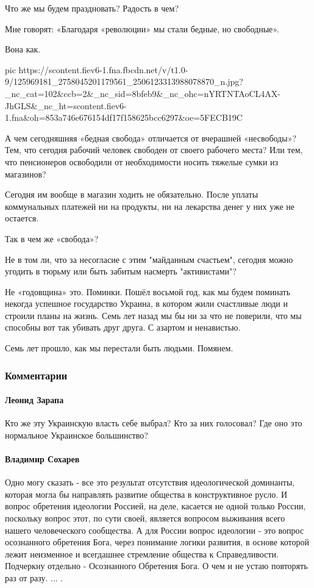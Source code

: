 Что же мы будем праздновать? Радость в чем? 

Мне говорят: «Благодаря «революции» мы стали бедные, но свободные».

Вона как.

\ifcmt
pic https://scontent.fiev6-1.fna.fbcdn.net/v/t1.0-9/125969181_2758045201179561_2506123313988078870_n.jpg?_nc_cat=102&ccb=2&_nc_sid=8bfeb9&_nc_ohc=nYRTNTAoCL4AX-JhGLS&_nc_ht=scontent.fiev6-1.fna&oh=853a746e676154df17f158625bcc6297&oe=5FECB19C
\fi

А чем сегодняшняя «бедная свобода» отличается от вчерашней «несвободы»? Тем,
что сегодня рабочий человек свободен от своего рабочего места? Или тем, что
пенсионеров освободили от необходимости носить тяжелые сумки из магазинов?

Сегодня им вообще в магазин ходить не обязательно. После уплаты коммунальных
платежей ни на продукты, ни на лекарства денег у них уже не остается. 

Так в чем же «свобода»? 

Не в том ли, что за несогласие с этим "майданным счастьем", сегодня можно
угодить в тюрьму или быть забитым насмерть "активистами"?

Не «годовщина» это. Поминки. Пошёл восьмой год, как  мы будем поминать некогда
успешное государство Украина, в котором  жили счастливые люди и строили планы
на жизнь. Семь лет назад мы бы ни за что не поверили, что мы способны вот так
убивать друг друга. С азартом и ненавистью. 

Семь лет прошло, как мы перестали быть людьми. Помянем.

\subsubsection{Комментарии}

\paragraph{Леонид Зарапа}
Кто же эту Украинскую власть себе выбрал? Кто за них голосовал? Где оно это
нормальное Украинское большинство?

\paragraph{Владимир Сохарев}

Одно могу сказать - все это результат отсутствия идеологической доминанты,
которая могла бы направлять развитие общества в конструктивное русло. И вопрос
обретения идеологии Россией, на деле, касается не одной только России,
поскольку вопрос этот, по сути своей, является вопросом выживания всего нашего
человеческого сообщества. А для России вопрос идеологии - это вопрос
осознанного обретения Бога, через понимание логики развития, в основе которой
лежит неизменное и всегдашнее стремление общества к Справедливости. Подчеркну
отдельно - Осознанного Обретения Бога. О чем и не устаю повторять раз от разу.
... .
